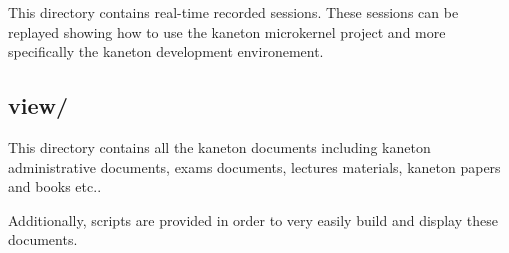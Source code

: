 This directory contains real-time recorded sessions. These sessions can be
replayed showing how to use the kaneton microkernel project and more
specifically the kaneton development environement.

%
%

\subsection*{view/}

This directory contains all the kaneton documents including kaneton
administrative documents, exams documents, lectures materials, kaneton papers
and books etc..

Additionally, scripts are provided in order to very easily build and
display these documents.
